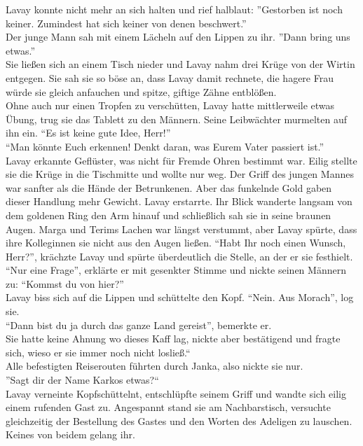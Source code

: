Lavay konnte nicht mehr an sich halten und rief halblaut: ''Gestorben ist noch keiner. Zumindest 
hat sich keiner von denen beschwert.''\\
Der junge Mann sah mit einem Lächeln auf den Lippen zu ihr. ''Dann bring uns etwas.''\\
Sie ließen sich an einem Tisch nieder und Lavay nahm drei Krüge von der Wirtin entgegen. Sie sah 
sie so böse an, dass Lavay damit rechnete, die hagere Frau würde sie gleich anfauchen und spitze, 
giftige Zähne entblößen.\\
Ohne auch nur einen Tropfen zu verschütten, Lavay hatte mittlerweile etwas Übung, trug sie das 
Tablett zu den Männern. Seine Leibwächter murmelten auf ihn ein. ``Es ist keine gute Idee, 
Herr!''\\
``Man könnte Euch erkennen! Denkt daran, was Eurem Vater passiert ist.''\\
Lavay erkannte Geflüster, was nicht für Fremde Ohren bestimmt war. Eilig stellte sie die Krüge in 
die Tischmitte und wollte nur weg. Der Griff des jungen Mannes war sanfter als die Hände der 
Betrunkenen. Aber das funkelnde Gold gaben dieser Handlung mehr Gewicht. Lavay erstarrte. Ihr Blick 
wanderte langsam von dem goldenen Ring den Arm hinauf und schließlich sah sie in seine braunen 
Augen. Marga und Terims Lachen war längst verstummt, aber Lavay spürte, dass ihre Kolleginnen sie 
nicht aus den Augen ließen. ``Habt Ihr noch einen Wunsch, Herr?'', krächzte Lavay und spürte 
überdeutlich die Stelle, an der er sie festhielt.\\
``Nur eine Frage'', erklärte er mit gesenkter Stimme und nickte seinen Männern zu: ``Kommst du 
von hier?''\\
Lavay biss sich auf die Lippen und schüttelte den Kopf. ``Nein. Aus Morach'', log sie.\\
``Dann bist du ja durch das ganze Land gereist'', bemerkte er.\\
Sie hatte keine Ahnung wo dieses Kaff lag, nickte aber bestätigend und fragte sich, wieso er sie 
immer noch nicht losließ.``\\
Alle befestigten Reiserouten führten durch Janka, also nickte sie nur.\\
''Sagt dir der Name Karkos etwas?``\\
Lavay verneinte Kopfschüttelnt, entschlüpfte seinem Griff und wandte sich eilig einem rufenden Gast 
zu. Angespannt stand sie am Nachbarstisch, versuchte gleichzeitig der Bestellung des Gastes und den 
Worten des Adeligen zu lauschen. Keines von beidem gelang ihr.\\
